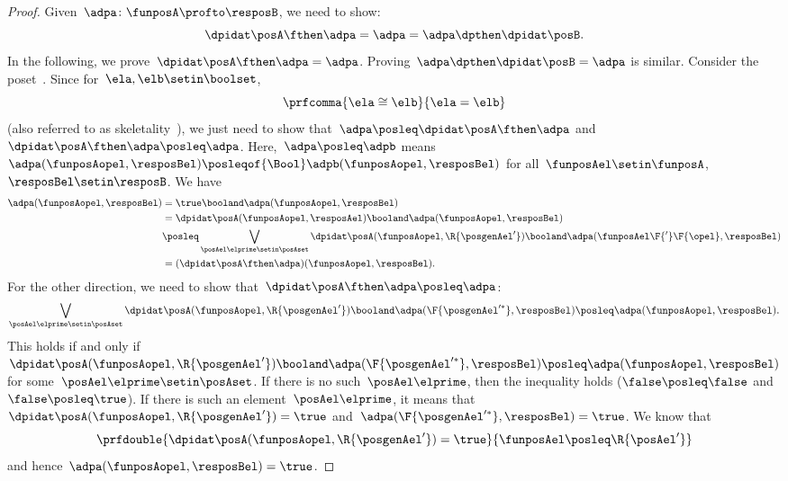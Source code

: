 \begin{proof}
    Given~$\adpa\colon \funposA\profto \resposB$, we need to show:
    \begin{equation}
        \dpidat\posA \fthen \adpa = \adpa = \adpa \dpthen \dpidat\posB.
    \end{equation}
    In the following, we prove~$\dpidat\posA \fthen \adpa = \adpa$.
    Proving~$\adpa\dpthen \dpidat\posB=\adpa$ is similar.
    Consider the poset~\Bool.
    Since for~$\ela,\elb\setin \boolset$,
    \begin{equation}
        \prfcomma{
            \ela\cong \elb
        }{
            \ela=\elb
        }
    \end{equation}
    (also referred to as skeletality~\cite{fong2019}), we just need to show that~$\adpa\posleq \dpidat\posA\fthen \adpa$ and~$\dpidat\posA\fthen \adpa\posleq \adpa$.
    Here,~$\adpa\posleq \adpb$ means~$\adpa(\funposAopel,\resposBel)\posleqof{\Bool}\adpb(\funposAopel,\resposBel)$ for all~$\funposAel\setin \funposA$,~$\resposBel\setin \resposB$.
    We have
    \begin{equation}
        \label{eq:dp_unit_1}
        \begin{aligned}
            \adpa(\funposAopel,\resposBel) & =\true \booland \adpa(\funposAopel,\resposBel) \\
                                           & = \dpidat\posA(\funposAopel,\resposAel) \booland \adpa(\funposAopel,\resposBel) \\
                                           & \posleq \bigvee_{\posAel\elprime \setin \posAset}\dpidat\posA(\funposAopel,\R{\posgenAel'})\booland \adpa(\funposAel\F{'}\F{\opel},\resposBel) \\
                                           & =(\dpidat\posA\fthen \adpa)(\funposAopel,\resposBel).
        \end{aligned}
    \end{equation}
    For the other direction, we need to show that~$\dpidat\posA\fthen \adpa\posleq \adpa$:
    \begin{equation}
        \label{eq:dp_unit_2}
        \bigvee_{\posAel\elprime\setin \posAset}\dpidat\posA(\funposAopel,\R{\posgenAel'})\booland \adpa(\F{\posgenAel'^*},\resposBel) \posleq \adpa(\funposAopel,\resposBel).
    \end{equation}
    This holds if and only if~$\dpidat\posA(\funposAopel,\R{\posgenAel'})\booland \adpa(\F{\posgenAel'^*},\resposBel) \posleq \adpa(\funposAopel,\resposBel)$ for some~$\posAel\elprime\setin \posAset$.
    If there is no such~$\posAel\elprime$, then the inequality holds ($\false \posleq \false$ and~$\false \posleq \true$).
    If there is such an element~$\posAel\elprime$, it means that~$\dpidat\posA(\funposAopel,\R{\posgenAel'})=\true$ and~$\adpa(\F{\posgenAel'^*},\resposBel)=\true$.
    We know that
    \begin{equation}
        \prfdouble{
            \dpidat\posA(\funposAopel,\R{\posgenAel'})=\true
        }{
            \funposAel \posleq \R{\posAel'}
        }
    \end{equation}
    and hence~$\adpa(\funposAopel,\resposBel)=\true$.
\end{proof}
